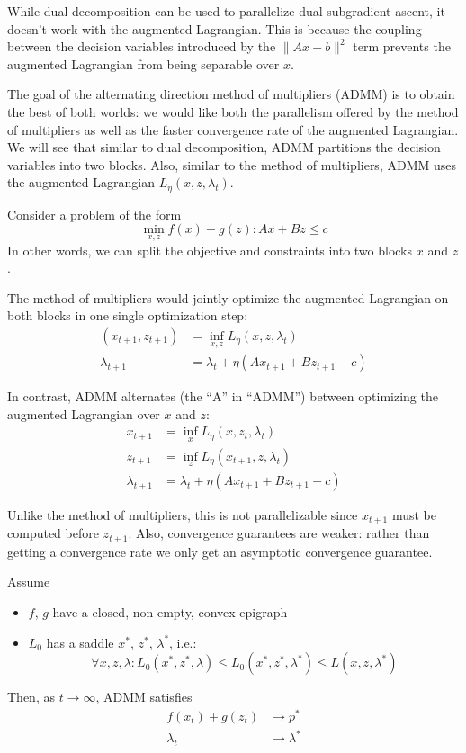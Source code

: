 While dual decomposition can be used to parallelize dual subgradient ascent,
it doesn't work with the augmented Lagrangian. This is because the coupling between
the decision variables introduced by the $\| A x - b \|^2$ term prevents
the augmented Lagrangian from being separable over $x$.

The goal of the alternating direction method of multipliers (ADMM) is to obtain
the best of both worlds: we would like both the parallelism offered by the method
of multipliers as well as the faster convergence rate of the augmented Lagrangian.
We will see that similar to dual decomposition, ADMM partitions
the decision variables into two blocks. Also, similar to the method of multipliers,
ADMM uses the augmented Lagrangian $L_\eta(x,z,\lambda_t)$.

Consider a problem of the form
\[
\min_{x,z} f(x) + g(z) : A x + B z \leq c
\]
In other words, we can split the objective and constraints into two blocks $x$ and $z$.

The method of multipliers would jointly optimize the augmented Lagrangian
on both blocks in one single optimization step:
\begin{align*}
(x_{t+1}, z_{t+1}) &= \inf_{x,z} L_\eta(x,z,\lambda_t)\\
\lambda_{t+1} &= \lambda_t + \eta(A x_{t+1} + B z_{t+1} - c)
\end{align*}

In contrast, ADMM alternates (the ``A'' in ``ADMM'') between optimizing
the augmented Lagrangian over $x$ and $z$:
\begin{align*}
x_{t+1} &= \inf_{x} L_\eta(x, z_t, \lambda_t) \\
z_{t+1} &= \inf_{z} L_\eta(x_{t+1}, z, \lambda_t) \\
\lambda_{t+1} &= \lambda_t + \eta(A x_{t+1} + B z_{t+1} - c)
\end{align*}

Unlike the method of multipliers, this is not parallelizable
since $x_{t+1}$ must be computed before $z_{t+1}$. Also, convergence
guarantees are weaker: rather than getting a convergence rate we only get an asymptotic
convergence guarantee.

\begin{theorem}
Assume
\begin{itemize}
\item $f$, $g$ have a closed, non-empty, convex
epigraph
\item $L_0$ has a saddle $x^*$, $z^*$, $\lambda^*$, i.e.:
\[
\forall x,z,\lambda: L_0(x^*,z^*,\lambda) \leq L_0(x^*,z^*,\lambda^*)\leq L(x,z,\lambda^*)
\]
\end{itemize}
Then, as $t \to \infty$, ADMM satisfies
\begin{align*}
f(x_t) + g(z_t) &\to p^*\\
\lambda_t &\to \lambda^*
\end{align*}
\end{theorem}

